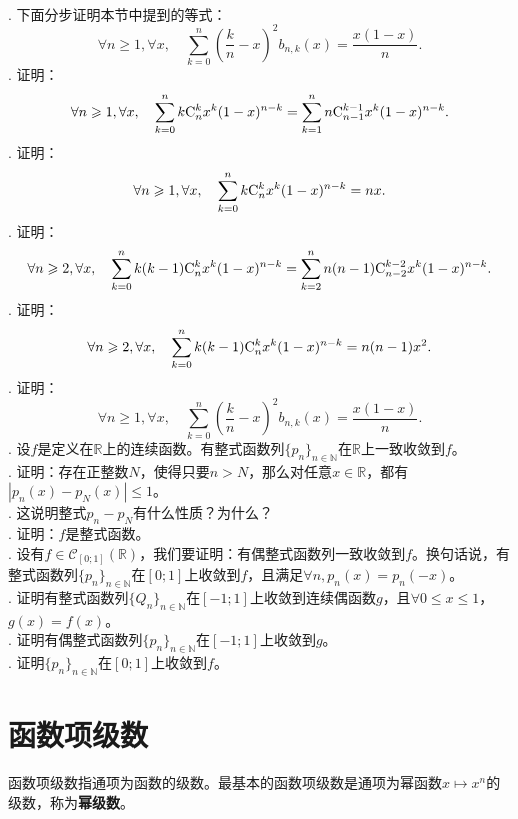 \documentclass[12pt,UTF8]{ctexbook}
\begin{document}
\begin{appendix}
\begin{xt}
    \mbox{} \\
    . 下面分步证明本节中提到的等式：
    \[\forall n \geqslant 1, \forall x, \quad \sum_{k=0}^n \left(\frac{k}{n} - x\right)^2 b_{n,k}(x) = \frac{x(1 - x)}{n}.\]
    . 证明：
    \[\forall n \geqslant 1, \forall x, \quad \sum_{k=0}^n k \mathrm{C}_{n}^{k} x^k(1 - x)^{n-k} = \sum_{k=1}^n n \mathrm{C}_{n-1}^{k-1} x^k(1 - x)^{n-k}. \]
    . 证明：
    \[\forall n \geqslant 1, \forall x, \quad \sum_{k=0}^n k \mathrm{C}_{n}^{k} x^k(1 - x)^{n-k} = nx.\]
    . 证明：
    \[\forall n \geqslant 2, \forall x, \quad \sum_{k=0}^n k(k - 1) \mathrm{C}_{n}^{k} x^k(1 - x)^{n-k} = \sum_{k=2}^n n(n - 1) \mathrm{C}_{n-2}^{k-2} x^k(1 - x)^{n-k}. \]
    . 证明：
    \[\forall n \geqslant 2, \forall x, \quad \sum_{k=0}^n k(k - 1) \mathrm{C}_{n}^{k} x^k(1 - x)^{n-k} = n(n - 1) x^2. \]
    . 证明：
    \[\forall n \geqslant 1, \forall x, \quad \sum_{k=0}^n \left(\frac{k}{n} - x\right)^2 b_{n,k}(x) = \frac{x(1 - x)}{n}.\]
    . 设$f$是定义在$\mathbb{R}$上的连续函数。有整式函数列$\{p_n\}_{n\in\mathbb{N}}$在$\mathbb{R}$上一致收敛到$f$。\\
    . 证明：存在正整数$N$，使得只要$n>N$，那么对任意$x\in\mathbb{R}$，都有$|p_n(x) - p_N(x)| \leqslant 1$。\\
    . 这说明整式$p_n - p_N$有什么性质？为什么？\\
    . 证明：$f$是整式函数。\\
    . 设有$f\in\mathcal{C}_{[0;1]}(\mathbb{R})$，我们要证明：有偶整式函数列一致收敛到$f$。换句话说，有整式函数列$\{p_n\}_{n\in\mathbb{N}}$在$[0;1]$上收敛到$f$，且满足$\forall n, p_n(x) = p_n(-x)$。\\
    . 证明有整式函数列$\{Q_n\}_{n\in\mathbb{N}}$在$[-1;1]$上收敛到连续偶函数$g$，且$\forall 0\leqslant x\leqslant 1$，$g(x) = f(x)$。\\
    . 证明有偶整式函数列$\{p_n\}_{n\in\mathbb{N}}$在$[-1;1]$上收敛到$g$。\\
    . 证明$\{p_n\}_{n\in\mathbb{N}}$在$[0;1]$上收敛到$f$。
\end{xt}

\section{函数项级数}

函数项级数指通项为函数的级数。最基本的函数项级数是通项为幂函数$x\mapsto x^n$的级数，称为\textbf{幂级数}。


\end{appendix}
\end{document}
